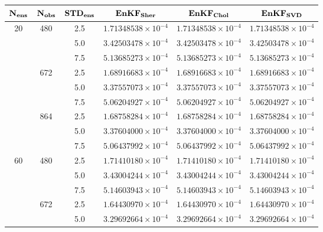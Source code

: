 \documentclass[12pt]{article}
\begin{document}
\begin{table}[H]
\centering
{\footnotesize
\begin{tabular}{|c|c|c|c|c|c|} \hline
$\bf N_{ens}$ & $\bf N_{obs}$ & $\bf STD_{ens}$ & ${\bf  EnKF_{Sher} }$ & ${\bf EnKF_{Chol}  }$ & ${\bf  EnKF_{SVD} }$ \\ \hline


\multirow{9}{*}{20} &  \multirow{3}{*}{480}  & 2.5 & $1.71348538 \times 10^{-4}$ & $1.71348538 \times 10^{-4} $ & $ 1.71348538 \times 10^{-4} $ \\
& & 5.0 & $ 3.42503478 \times 10^{-4} $ & $ 3.42503478 \times 10^{-4} $ & $ 3.42503478 \times 10^{-4} $  \\ 
& & 7.5 & $ 5.13685273 \times 10^{-4} $ & $ 5.13685273 \times 10^{-4} $ & $ 5.13685273 \times 10^{-4} $  \\ 
\cline{2-6}
&  \multirow{3}{*}{672}  & 2.5 & $ 1.68916683 \times 10^{-4} $ & $ 1.68916683 \times 10^{-4} $ & $ 1.68916683 \times 10^{-4} $ \\
& & 5.0 & $ 3.37557073 \times 10^{-4} $ & $ 3.37557073 \times 10^{-4} $ & $ 3.37557073 \times 10^{-4} $  \\ 
& & 7.5 & $ 5.06204927 \times 10^{-4} $ & $ 5.06204927 \times 10^{-4} $ & $ 5.06204927 \times 10^{-4} $  \\ 
\cline{2-6}
&  \multirow{3}{*}{864}  & 2.5 & $ 1.68758284 \times 10^{-4} $ & $ 1.68758284 \times 10^{-4} $ & $ 1.68758284 \times 10^{-4} $ \\
& & 5.0 & $ 3.37604000 \times 10^{-4} $ & $ 3.37604000 \times 10^{-4} $ & $ 3.37604000 \times 10^{-4} $  \\ 
& & 7.5 & $ 5.06437992 \times 10^{-4} $ & $ 5.06437992 \times 10^{-4} $ & $ 5.06437992 \times 10^{-4} $  \\ 
\cline{1-6}
\multirow{9}{*}{60} &  \multirow{3}{*}{480}  & 2.5 & $1.71410180 \times 10^{-4}$ & $1.71410180 \times 10^{-4} $ & $ 1.71410180 \times 10^{-4} $ \\
& & 5.0 & $ 3.43004244 \times 10^{-4} $ & $ 3.43004244 \times 10^{-4} $ & $ 3.43004244 \times 10^{-4} $  \\ 
& & 7.5 & $ 5.14603943 \times 10^{-4} $ & $ 5.14603943 \times 10^{-4} $ & $ 5.14603943 \times 10^{-4} $  \\ 
\cline{2-6}
&  \multirow{3}{*}{672}  & 2.5 & $ 1.64430970 \times 10^{-4} $ & $ 1.64430970 \times 10^{-4} $ & $ 1.64430970 \times 10^{-4} $ \\
& & 5.0 & $ 3.29692664 \times 10^{-4} $ & $ 3.29692664 \times 10^{-4} $ & $ 3.29692664 \times 10^{-4} $  \\ 

\end{tabular}}
\end{table}
\end{document}
